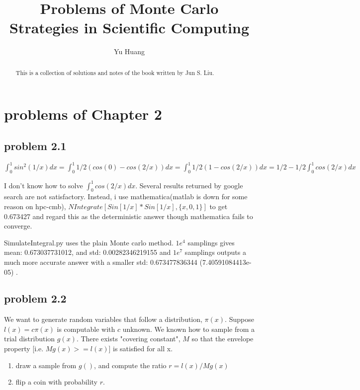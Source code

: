 \documentclass[a4paper,10pt]{article}
\title{Problems of Monte Carlo Strategies in Scientific Computing}
\author{Yu Huang}
\begin{document}
\maketitle

\begin{abstract}
This is a collection of solutions and notes of the book written by Jun S. Liu.
\end{abstract}
\tableofcontents

\section{problems of Chapter 2}
\subsection{problem 2.1}

\begin{math}
\int_{0}^{1} sin^2(1/x)dx = \int_{0}^{1}1/2(cos(0)-cos(2/x))dx = \int_{0}^{1}1/2(1-cos(2/x))dx = 1/2 - 1/2\int_{0}^{1}cos(2/x)dx
\end{math}

I don't know how to solve $\int_{0}^{1}cos(2/x)dx$. Several results returned by google search are not satisfactory. Instead, i use mathematica(matlab is down for some reason on hpc-cmb), $NIntegrate[Sin[1/x]*Sin[1/x], \{x, 0, 1\}]$ to get 0.673427 and regard this as the deterministic answer though mathematica fails to converge.

SimulateIntegral.py uses the plain Monte carlo method. $1e^4$ samplings gives mean: 0.673037731012, and std: 0.00282346219155 and $1e^7$ samplings outputs a much more accurate answer with a smaller std: 0.673477836344 (7.40591084413e-05) .

\subsection{problem 2.2}
We want to generate random variables that follow a distribution, $\pi(x)$. Suppose $l(x)=c\pi(x)$ is computable with $c$ unknown. We known how to sample from a trial distribution $g(x)$. There exists "covering constant", $M$ so that the envelope property [i.e. $Mg(x)>=l(x)$] is satisfied for all x.

\begin{enumerate}
\item draw a sample from $g()$, and compute the ratio $r=l(x)/Mg(x)$
\item flip a coin with probability $r$.
\end{enumerate}
\end{document}
